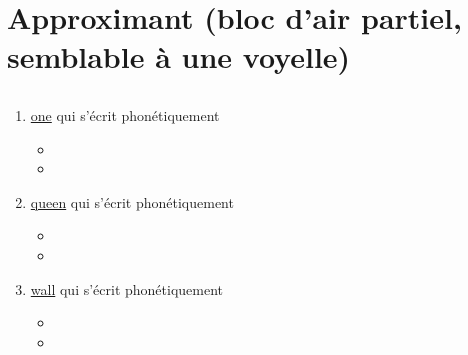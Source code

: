 \section{Approximant (bloc d'air partiel, semblable à une voyelle)}
\label{sec:approx}

\subsection{}\label{subsec:w}

\begin{enumerate}
\item \href{http://www.wordreference.com/enfr/one}{one} qui s'écrit phonétiquement \href{https://en.oxforddictionaries.com/definition/one}{}

  \begin{itemize}
  \item{}
  \item{}
  \end{itemize}


\item \href{http://www.wordreference.com/enfr/queen}{queen} qui s'écrit phonétiquement \href{https://en.oxforddictionaries.com/definition/queen}{}

  \begin{itemize}
  \item{}
  \item{}
  \end{itemize}


\item \href{http://www.wordreference.com/enfr/wall}{wall} qui s'écrit phonétiquement \href{https://en.oxforddictionaries.com/definition/wall}{}

  \begin{itemize}
  \item{}
  \item{}
  \end{itemize}


\end{enumerate}
